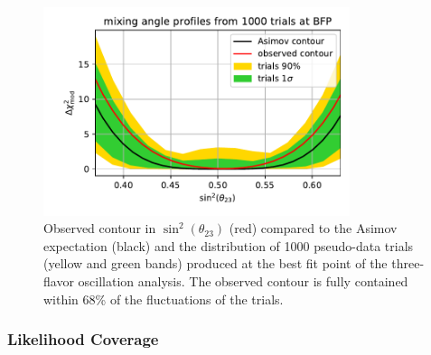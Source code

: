 \begin{figure}
    \centering
        \includegraphics[width=0.8\textwidth]{figures/measurement/three_flavor/results/mixing_brazil_band.pdf}  
  \caption{Observed contour in $\sin^2(\theta_{23})$ (red) compared to the Asimov expectation (black) and the distribution of 1000 pseudo-data trials (yellow and green bands) produced at the best fit point of the three-flavor oscillation analysis. The observed contour is fully contained within 68\% of the fluctuations of the trials.
  \label{fig:mixing_brazil_band_three_flavor}}
\end{figure}

\subsubsection{Likelihood Coverage}

